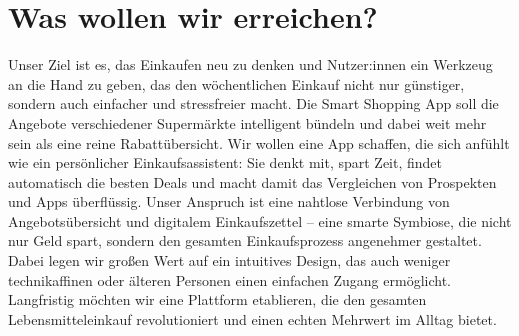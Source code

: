 \section{Was wollen wir erreichen?}
Unser Ziel ist es, das Einkaufen neu zu denken und Nutzer:innen ein Werkzeug an die Hand zu geben, das den wöchentlichen Einkauf nicht nur günstiger, sondern auch einfacher und stressfreier macht. Die Smart Shopping App soll die Angebote verschiedener Supermärkte intelligent bündeln und dabei weit mehr sein als eine reine Rabattübersicht. Wir wollen eine App schaffen, die sich anfühlt wie ein persönlicher Einkaufsassistent: Sie denkt mit, spart Zeit, findet automatisch die besten Deals und macht damit das Vergleichen von Prospekten und Apps überflüssig.
Unser Anspruch ist eine nahtlose Verbindung von Angebotsübersicht und digitalem Einkaufszettel – eine smarte Symbiose, die nicht nur Geld spart, sondern den gesamten Einkaufsprozess angenehmer gestaltet. Dabei legen wir großen Wert auf ein intuitives Design, das auch weniger technikaffinen oder älteren Personen einen einfachen Zugang ermöglicht. Langfristig möchten wir eine Plattform etablieren, die den gesamten Lebensmitteleinkauf revolutioniert und einen echten Mehrwert im Alltag bietet. 